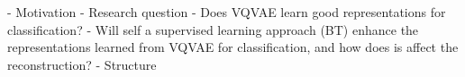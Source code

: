 \documentclass[../../thesis.tex]{subfiles}
\begin{document}
- Motivation
- Research question
	- Does VQVAE learn good representations for classification?
	- Will self a supervised learning approach (BT) enhance the representations learned from VQVAE for classification, and how does is affect the reconstruction?
- Structure
\end{document}
